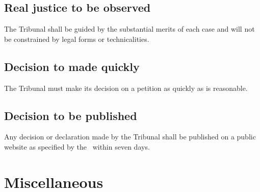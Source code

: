 \documentclass[12pt]{report}
\begin{document}
  \section{Real justice to be observed}
  \begin{fenumerate} \item
The Tribunal shall be guided by the substantial merits of each case and will not be constrained by legal forms or technicalities.%
\end{fenumerate}
    \section{Decision to made quickly}
    \begin{fenumerate}
      \item The Tribunal must make its decision on a petition as quickly as is reasonable.
    \end{fenumerate}
\section{Decision to be published}
\begin{fenumerate}
  \item Any decision or declaration made by the Tribunal shall be published on a public website as specified by the \RaceDirector\ within seven days.
\end{fenumerate}
  \chapter{Miscellaneous}
\end{document}
